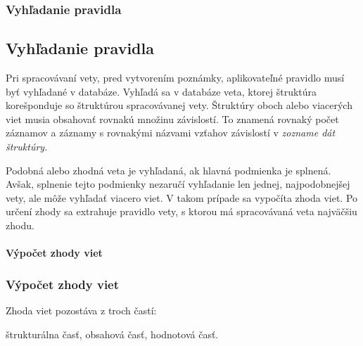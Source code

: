 %
%
{
	\subsubsection{Vyhľadanie pravidla}
}
{
	\subsection{Vyhľadanie pravidla}
}

\label{subsubsection:rule_lookup}
Pri spracovávaní vety, pred vytvorením poznámky, aplikovateľné pravidlo musí byť vyhľadané v databáze. Vyhľadá sa v databáze veta, ktorej štruktúra korešponduje so štruktúrou spracovávanej vety. Štruktúry oboch alebo viacerých viet musia obsahovať rovnakú množinu závislostí. To znamená rovnaký počet záznamov a záznamy s rovnakými názvami vzťahov závislostí v \textit{zozname dát štruktúry}.

Podobná alebo zhodná veta je vyhľadaná, ak hlavná podmienka je splnená. Avšak, splnenie tejto podmienky nezaručí vyhľadanie len jednej, najpodobnejšej vety, ale môže vyhľadať viacero viet. V takom prípade sa vypočíta zhoda viet. Po určení zhody sa extrahuje pravidlo vety, s ktorou má spracovávaná veta najväčšiu zhodu.

%
%
{
	\paragraph{Výpočet zhody viet}
}
{
	\subsubsection{Výpočet zhody viet}
}
\label{paragraph:sentences_match}

Zhoda viet pozostáva z troch častí:
\begin{my_itemize}
	\myitem štrukturálna časť,
	\myitem obsahová časť,
	\myitem hodnotová časť.
\end{my_itemize}

